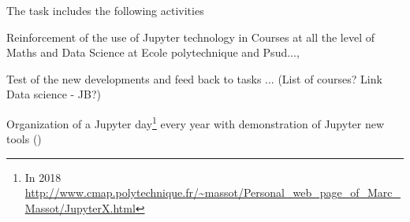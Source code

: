 \begin{task}[
  title=Teaching with Jupyter technology,
  id=teaching,
  lead=EP,
  PM=8, %
  wphases={0-48},
  partners={EP,UPSUD}
  ]
  The task includes the following activities
  \begin{compactitem}
  \item Reinforcement of the use of Jupyter technology in Courses at all the level of Maths and Data Science at Ecole polytechnique and Psud...,
  \item Test of the new developments and feed back to tasks ... (List of courses? Link Data science - JB?)
  \item Organization of a Jupyter day\footnote{In 2018 \url{http://www.cmap.polytechnique.fr/~massot/Personal_web_page_of_Marc_Massot/JupyterX.html}} every year with demonstration of Jupyter new tools
    ()
  \end{compactitem}
\end{task}
